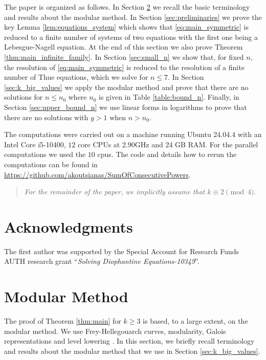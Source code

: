 \documentclass[12pt]{amsart}
\numberwithin{equation}{section}
\theoremstyle{definition}
\theoremstyle{remark}
\begin{document}
The paper is organized as follows. In Section \ref{sec:modular_method} we recall the basic terminology and results about the modular method. In Section \ref{sec:preliminaries} we prove the key Lemma \ref{lem:equations_system} which shows that \eqref{eq:main_symmetric} is reduced to a finite number of systems of two equations with the first one being a Lebesgue-Nagell equation. At the end of this section we also prove Theorem \ref{thm:main_infinite_family}. In Section \ref{sec:small_n} we show that, for fixed $n$, the resolution of \eqref{eq:main_symmetric} is reduced to the resolution of a finite number of Thue equations, which we solve for $n\leq 7$. In Section \ref{sec:k_big_values} we apply the modular method and prove that there are no solutions for $n\leq n_0$ where $n_0$ is given in Table \ref{table:bound_n}. Finally, in Section \ref{sec:upper_bound_n} we use linear forms in logarithms to prove that there are no solutions with $y>1$ when $n > n_0$.

The computations were carried out on a machine running Ubuntu 24.04.4 with 
an Intel Core i5-10400, $12$ core CPUs at 2.90GHz and 24 GB RAM. For the 
parallel computations we used the $10$ cpus. The code and details how to 
rerun the computations can be found in 
\href{https://github.com/akoutsianas/SumOfConsecutivePowers}{https://github.com/akoutsianas/SumOfConsecutivePowers}.

\begin{quote}
  \emph{For the remainder of the paper, we implicitly assume that} $k\equiv 2\pmod{4}$. 
\end{quote}


\section{Acknowledgments}

The first author was supported by the Special Account for Research Funds AUTH research grant ``\textit{Solving Diophantine Equations-10349}''.


\section{Modular Method}\label{sec:modular_method}

The proof of Theorem \ref{thm:main} for $k\geq 3$ is based, to a
large extent, on the modular method. We use Frey-Hellegouarch curves, modularity, Galois representations and level lowering \cite{Ribet90, Wiles95, TaylorWiles95, BreuilConradDiamondTaylor01, BennettSkinner04, BugeaudMignotteSiksek06}. In this section, we briefly recall terminology and results about the modular method that we use in Section \ref{sec:k_big_values}.
\end{document}
